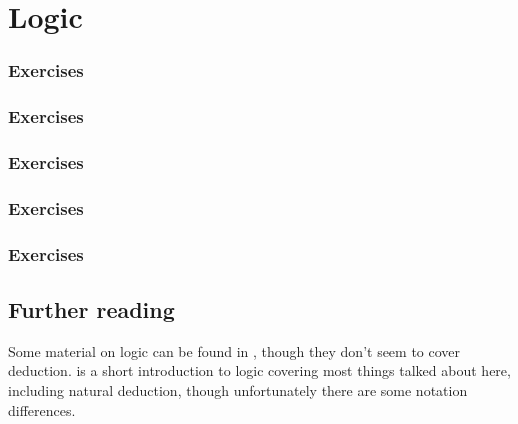 \documentclass{article}
\theoremstyle{plain}
\numberwithin{theorem}{subsection}
\begin{document}
\section{Logic}{
\let\section\subsection
\let\subsection\subsubsection

\subsubsection*{Exercises}



\subsubsection*{Exercises}



\subsubsection*{Exercises}



\subsubsection*{Exercises}



\subsubsection*{Exercises}


\section{Further reading}
Some material on logic can be found in \cite[chapter 3]{LTLM17}, though they don't seem to cover deduction. \cite{Tel89} is a short introduction to logic covering most things talked about here, including natural deduction, though unfortunately there are some notation differences. }
\newpage
\end{document}
